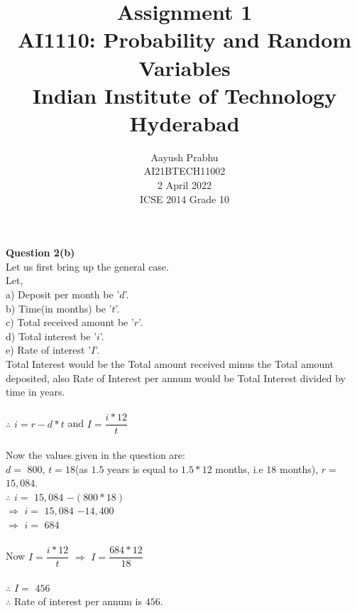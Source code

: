 \documentclass[journal,12pt,twocolumn]{IEEEtran}
\title{Assignment 1 \\ \Large AI1110: Probability and Random Variables \\ \large Indian Institute of Technology Hyderabad}
\author{Aayush Prabhu \\ \normalsize AI21BTECH11002 \\ \vspace*{20pt} \normalsize  2 April 2022 \\ \vspace*{20pt} \Large ICSE 2014 Grade 10}
\begin{document}
       \maketitle
       \textbf{Question 2(b)}\\
       Let us first bring up the general case.\\
       Let,\\
       a) Deposit per month be '$d$'.\\
       b) Time(in months) be '$t$'.\\
       c) Total received amount be '$r$'.\\
       d) Total interest be '$i$'.\\
       e) Rate of interest '$I$'.\\
       Total Interest would be the Total amount received minus the Total amount deposited, also Rate of Interest per annum would be Total Interest divided by time in years.\\\\
       $\therefore$ $i=r-d*t$ and $I=\dfrac{i*12}{t}$\\\\
       Now the values given in the question are:\\
       $d=$ \rupee$800$, $t=18$(as $1.5$ years is equal to $1.5*12$ months, i.e $18$ months), $r=$ \rupee$15,084$.\\
       $\therefore$ $i=$ \rupee$15,084$ $-$\rupee$(800*18)$\\
       $\Rightarrow$ $i=$ \rupee$15,084$ $-$\rupee$14,400$\\
       $\Rightarrow$ $i=$ \rupee$684$\\\\
       Now $I=\dfrac{i*12}{t}$
       $\Rightarrow$ $I=\dfrac{684*12}{18}$\\\\
       $\therefore$ $I=$ \rupee$456$\\
       $\therefore$ Rate of interest per annum is \rupee$456$.
\end{document}
